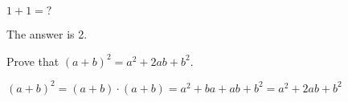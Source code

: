 \documentclass[11pt]{article}
\begin{document}
\maketitle

\begin{HWProblem}
$1 + 1 = \text{?}$
\end{HWProblem}

\begin{HWSolution}
The answer is 2.
\end{HWSolution}

\begin{HWProblem}[5]
Prove that $(a + b)^2 = a^2 + 2ab + b^2$.
\end{HWProblem}

\begin{HWProof}
$(a + b)^2 = (a + b) \cdot (a + b) = a^2 + ba + ab + b^2 = a^2 + 2ab + b^2$
\end{HWProof}
\end{document}
